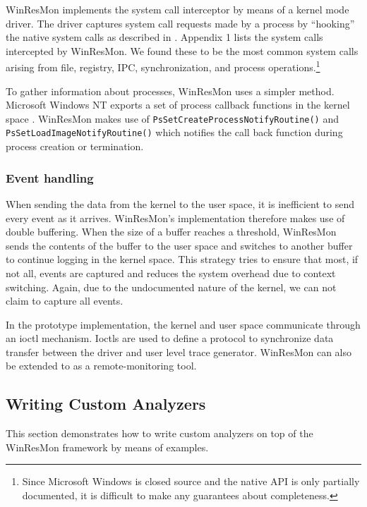 WinResMon implements the system call interceptor by means of a kernel mode driver.
The driver captures system call requests made by a process by ``hooking'' the
native system calls as described in \cite{ddj-nthooking}.  Appendix 1 lists the
system calls intercepted by WinResMon.  We found these to be the most common
system calls arising from file, registry, IPC, synchronization, and process
operations.\footnote{ Since Microsoft Windows is closed source and the native
API is only partially documented, it is difficult to make any guarantees about
completeness.  }

To gather information about processes, WinResMon uses a simpler method.
Microsoft Windows NT exports a set of process callback functions in the kernel
space \cite{msdn-proccallback}.
WinResMon makes use of {\small\tt PsSetCreateProcessNotifyRoutine()} and
{\small\tt PsSetLoadImageNotifyRoutine()} which notifies the call back function
during process creation or termination.


\subsubsection{Event handling}

When sending the data from the kernel to the user space, it is inefficient to
send every event as it arrives.  WinResMon's implementation therefore makes use
of double buffering.  When the size of a buffer reaches a threshold, WinResMon
sends the contents of the buffer to the user space and switches to another
buffer to continue logging in the kernel space.  This strategy tries to ensure
that most, if not all, events are captured and reduces the system overhead due
to context switching.  Again, due to the undocumented nature of the kernel, we
can not claim to capture all events.

In the prototype implementation, the kernel and user space communicate through
an ioctl mechanism. Ioctls are used to define a protocol 
to synchronize data transfer between the driver and 
user level trace generator.
WinResMon can also be extended to as a remote-monitoring tool.


\subsection{Writing Custom Analyzers}
\label{sect:sample}

This section demonstrates how to write custom analyzers on top of the WinResMon
framework by means of examples.

